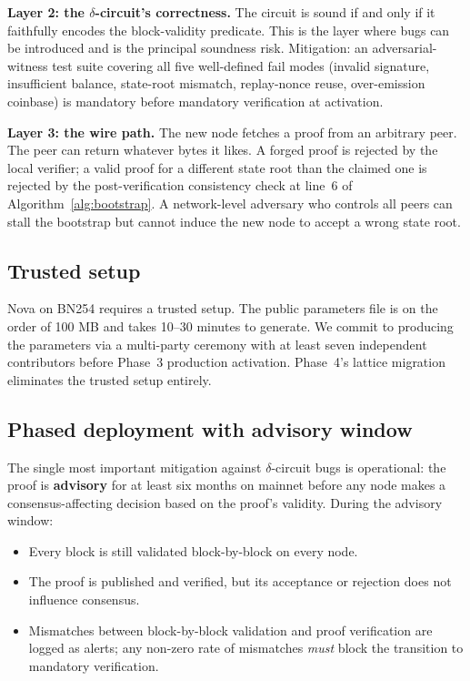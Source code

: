 \documentclass[11pt,a4paper]{article}
\begin{document}
\textbf{Layer 2: the $\delta$-circuit's correctness.} The circuit is
sound if and only if it faithfully encodes the block-validity predicate.
This is the layer where bugs can be introduced and is the principal
soundness risk. Mitigation: an adversarial-witness test suite covering
all five well-defined fail modes (invalid signature, insufficient
balance, state-root mismatch, replay-nonce reuse, over-emission
coinbase) is mandatory before mandatory verification at activation.

\textbf{Layer 3: the wire path.} The new node fetches a proof from
an arbitrary peer. The peer can return whatever bytes it likes. A
forged proof is rejected by the local verifier; a valid proof for a
different state root than the claimed one is rejected by the
post-verification consistency check at line~6 of
Algorithm~\ref{alg:bootstrap}. A network-level adversary who controls
all peers can stall the bootstrap but cannot induce the new node to
accept a wrong state root.

\subsection{Trusted setup}

Nova on BN254 requires a trusted setup. The public parameters file is
on the order of 100 MB and takes 10--30 minutes to generate. We
commit to producing the parameters via a multi-party ceremony with
at least seven independent contributors before Phase~3 production
activation. Phase~4's lattice migration eliminates the trusted setup
entirely.

\subsection{Phased deployment with advisory window}

The single most important mitigation against $\delta$-circuit bugs is
operational: the proof is \textbf{advisory} for at least six months on
mainnet before any node makes a consensus-affecting decision based on
the proof's validity. During the advisory window:

\begin{itemize}[leftmargin=*]
  \item Every block is still validated block-by-block on every node.
  \item The proof is published and verified, but its acceptance or
        rejection does not influence consensus.
  \item Mismatches between block-by-block validation and proof
        verification are logged as alerts; any non-zero rate of
        mismatches \emph{must} block the transition to mandatory
        verification.
\end{itemize}
\end{document}
